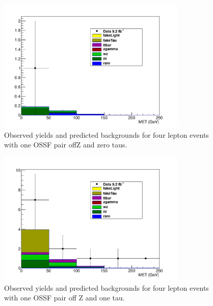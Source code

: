 \begin{figure}[htp]
\begin{center}
\includegraphics[width=0.8\textwidth]{plots/4L_MET_dist_offZ_ossf1_tau0_note.pdf}
\caption{Observed yields and predicted backgrounds for four lepton events with one OSSF pair offZ and zero taus.}
\label{fig:L4OSSF1offZtau0}
\end{center}
\end{figure}
\begin{figure}[htp]
\begin{center}
\includegraphics[width=0.8\textwidth]{plots/4L_MET_dist_offZ_ossf1_tau1_note.pdf}
\caption{Observed yields and predicted backgrounds for four lepton events with one OSSF pair off Z and one tau.}
\label{fig:L4OSSF1offZtau1}
\end{center}
\end{figure}
